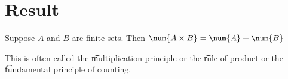 

\blankpage
\section*{Result}

\begin{proposition}
Suppose $A$ and $B$ are finite sets.
Then $\num{A \times  B} = \num{A} + \num{B}$\end{proposition}
This is often called the \t{multiplication principle} or the \t{rule of product} or the \t{fundamental principle of counting}.
\blankpage
